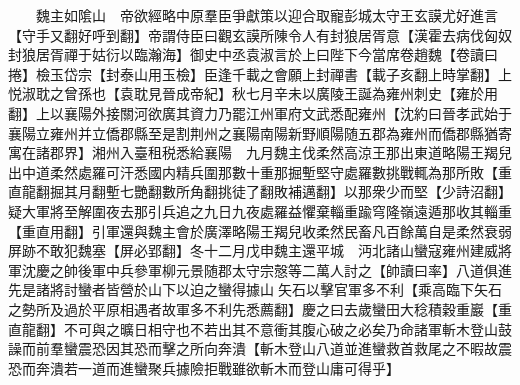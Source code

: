 　　魏主如隂山　帝欲經略中原羣臣爭獻策以迎合取寵彭城太守王玄謨尤好進言【守手又翻好呼到翻】帝謂侍臣曰觀玄謨所陳令人有封狼居胥意【漢霍去病伐匈奴封狼居胥禪于姑衍以臨瀚海】御史中丞袁淑言於上曰陛下今當席卷趙魏【卷讀曰捲】檢玉岱宗【封泰山用玉檢】臣逢千載之會願上封禪書【載子亥翻上時掌翻】上悦淑耽之曾孫也【袁耽見晉成帝紀】秋七月辛未以廣陵王誕為雍州刺史【雍於用翻】上以襄陽外接關河欲廣其資力乃罷江州軍府文武悉配雍州【沈約曰晉孝武始于襄陽立雍州并立僑郡縣至是割荆州之襄陽南陽新野順陽随五郡為雍州而僑郡縣猶寄寓在諸郡界】湘州入臺租税悉給襄陽　九月魏主伐柔然高涼王那出東道略陽王羯兒出中道柔然處羅可汗悉國内精兵圍那數十重那掘塹堅守處羅數挑戰輒為那所敗【重直龍翻掘其月翻塹七艷翻數所角翻挑徒了翻敗補邁翻】以那衆少而堅【少詩沼翻】疑大軍將至解圍夜去那引兵追之九日九夜處羅益懼棄輜重踰穹隆嶺遠遁那收其輜重【重直用翻】引軍還與魏主會於廣澤略陽王羯兒收柔然民畜凡百餘萬自是柔然衰弱屏跡不敢犯魏塞【屏必郢翻】冬十二月戊申魏主還平城　沔北諸山蠻寇雍州建威將軍沈慶之帥後軍中兵參軍柳元景随郡太守宗慤等二萬人討之【帥讀曰率】八道俱進先是諸將討蠻者皆營於山下以迫之蠻得據山矢石以擊官軍多不利【乘高臨下矢石之勢所及過於平原相遇者故軍多不利先悉薦翻】慶之曰去歲蠻田大稔積穀重巖【重直龍翻】不可與之曠日相守也不若出其不意衝其腹心破之必矣乃命諸軍斬木登山鼓譟而前羣蠻震恐因其恐而擊之所向奔潰【斬木登山八道並進蠻救首救尾之不暇故震恐而奔潰若一道而進蠻聚兵據險拒戰雖欲斬木而登山庸可得乎】

